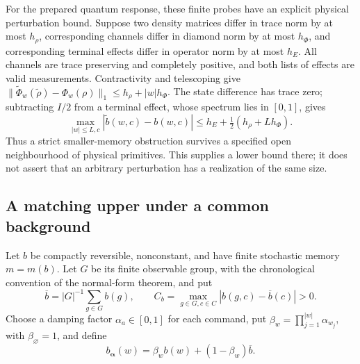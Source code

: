 For the prepared quantum response, these finite probes have an explicit
physical perturbation bound. Suppose two density matrices differ in trace
norm by at most $h_\rho$, corresponding channels differ in diamond norm by
at most $h_\Phi$, and corresponding terminal effects differ in operator norm
by at most $h_E$. All channels are trace preserving and completely positive,
and both lists of effects are valid measurements. Contractivity and telescoping
give $\|\widetilde\Phi_w(\widetilde\rho)-\Phi_w(\rho)\|_1
\le h_\rho+|w|h_\Phi$. The state difference has trace zero; subtracting
$I/2$ from a terminal effect, whose spectrum lies in $[0,1]$, gives
\begin{equation}\label{eq:r73-physical-probes}
 \max_{|w|\le L,c}|\widetilde b(w,c)-b(w,c)|
 \le h_E+\tfrac12(h_\rho+Lh_\Phi).
\end{equation}
Thus a strict smaller-memory obstruction survives a specified open
neighbourhood of physical primitives. This supplies a lower bound there;
it does not assert that an arbitrary perturbation has a realization of the
same size.

\subsection{A matching upper under a common background}
Let $b$ be compactly reversible, nonconstant, and have finite stochastic
memory $m=m(b)$. Let $G$ be its finite observable group, with the chronological
convention of the normal-form theorem, and put
\[
 \overline b=|G|^{-1}\sum_{g\in G} b(g),\qquad
 C_b=\max_{g\in G,c\in C}|b(g,c)-\overline b(c)|>0.
\]
Choose a damping factor $\alpha_a\in[0,1]$ for each command, put
$\beta_w=\prod_{j=1}^{|w|}\alpha_{w_j}$, with $\beta_\varnothing=1$, and define
\begin{equation}\label{eq:r73-common-background}
 b_{\boldsymbol\alpha}(w)
   =\beta_w b(w)+(1-\beta_w)\overline b.
\end{equation}

